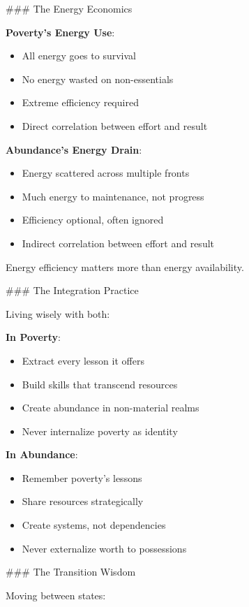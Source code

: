 \documentclass[12pt]{book}
\begin{document}
\#\#\# The Energy Economics

\textbf{Poverty's Energy Use}:
\begin{itemize}
\item All energy goes to survival
\item No energy wasted on non-essentials
\item Extreme efficiency required
\item Direct correlation between effort and result

\end{itemize}
\textbf{Abundance's Energy Drain}:
\begin{itemize}
\item Energy scattered across multiple fronts
\item Much energy to maintenance, not progress
\item Efficiency optional, often ignored
\item Indirect correlation between effort and result

\end{itemize}
Energy efficiency matters more than energy availability.

\#\#\# The Integration Practice

Living wisely with both:

\textbf{In Poverty}:
\begin{itemize}
\item Extract every lesson it offers
\item Build skills that transcend resources
\item Create abundance in non-material realms
\item Never internalize poverty as identity

\end{itemize}
\textbf{In Abundance}:
\begin{itemize}
\item Remember poverty's lessons
\item Share resources strategically
\item Create systems, not dependencies
\item Never externalize worth to possessions

\end{itemize}
\#\#\# The Transition Wisdom

Moving between states:
\end{document}
